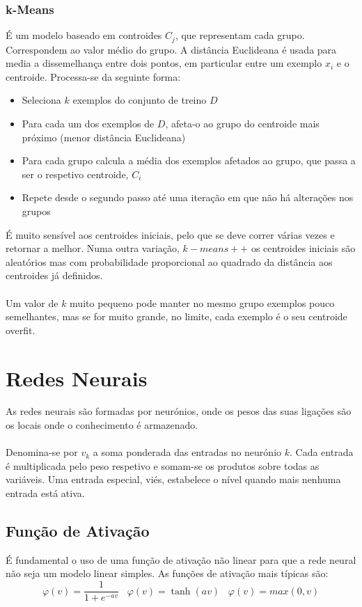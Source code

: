\documentclass[10pt,a4paper]{report}
\begin{document}
\subsubsection{k-Means}
É um modelo baseado em controides $C_j$, que representam cada grupo. Correspondem ao valor médio do grupo. A distância Euclideana é usada para media a dissemelhança entre dois pontos, em particular entre um exemplo $x_i$ e o centroide. Processa-se da seguinte forma:
\begin{itemize}
\item Seleciona $k$ exemplos do conjunto de treino $D$
\item Para cada um dos exemplos de $D$, afeta-o ao grupo do centroide mais próximo (menor distância Euclideana)
\item Para cada grupo calcula a média dos exemplos afetados ao grupo, que passa a ser o respetivo centroide, $C_i$
\item Repete desde o segundo passo até uma iteração em que não há alterações nos grupos
\end{itemize}
É muito sensível aos centroides iniciais, pelo que se deve correr várias vezes e retornar a melhor. Numa outra variação, $k-means++$ os centroides iniciais são aleatórios mas com probabilidade proporcional ao quadrado da distância aos centroides já definidos.\\
\\
Um valor de $k$ muito pequeno pode manter no mesmo grupo exemplos pouco semelhantes, mas se for muito grande, no limite, cada exemplo é o seu centroide overfit.
\section{Redes Neurais}
As redes neurais são formadas por neurónios, onde os pesos das suas ligações são os locais onde o conhecimento é armazenado.\\
\\
Denomina-se por $v_k$ a soma ponderada das entradas no neurónio $k$. Cada entrada é multiplicada pelo peso respetivo e somam-se os produtos sobre todas as variáveis. Uma entrada especial, viés, estabelece o nível quando mais nenhuma entrada está ativa.
\subsection{Função de Ativação}
É fundamental o uso de uma função de ativação não linear para que a rede neural não seja um modelo linear simples. As funções de ativação mais típicas são:
$$
\varphi(v)=\frac{1}{1+e^{-av}} \;\;\; \varphi(v) = \tanh (av) \;\;\; \varphi(v) = max(0,v)
$$
\end{document}
